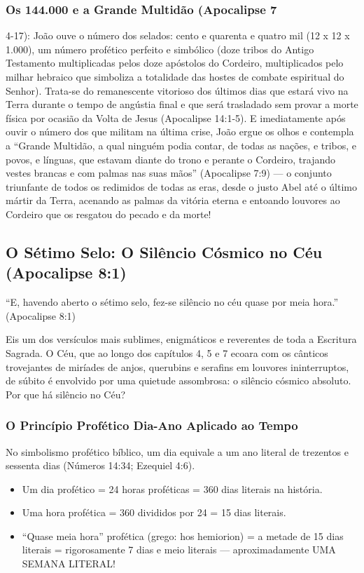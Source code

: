\subsubsection*{Os 144.000 e a Grande Multidão (Apocalipse 7}
4-17):
João ouve o número dos selados: cento e quarenta e quatro mil (12 x 12 x 1.000), um número profético perfeito e simbólico (doze tribos do Antigo Testamento multiplicadas pelos doze apóstolos do Cordeiro, multiplicados pelo milhar hebraico que simboliza a totalidade das hostes de combate espiritual do Senhor). Trata-se do remanescente vitorioso dos últimos dias que estará vivo na Terra durante o tempo de angústia final e que será trasladado sem provar a morte física por ocasião da Volta de Jesus (Apocalipse 14:1-5).
E imediatamente após ouvir o número dos que militam na última crise, João ergue os olhos e contempla a ``Grande Multidão, a qual ninguém podia contar, de todas as nações, e tribos, e povos, e línguas, que estavam diante do trono e perante o Cordeiro, trajando vestes brancas e com palmas nas suas mãos'' (Apocalipse 7:9) — o conjunto triunfante de todos os redimidos de todas as eras, desde o justo Abel até o último mártir da Terra, acenando as palmas da vitória eterna e entoando louvores ao Cordeiro que os resgatou do pecado e da morte!



\subsection{O Sétimo Selo: O Silêncio Cósmico no Céu (Apocalipse 8:1)}


``E, havendo aberto o sétimo selo, fez-se silêncio no céu quase por meia hora.'' (Apocalipse 8:1)

Eis um dos versículos mais sublimes, enigmáticos e reverentes de toda a Escritura Sagrada. O Céu, que ao longo dos capítulos 4, 5 e 7 ecoara com os cânticos trovejantes de miríades de anjos, querubins e serafins em louvores ininterruptos, de súbito é envolvido por uma quietude assombrosa: o silêncio cósmico absoluto.
Por que há silêncio no Céu?


\subsubsection*{O Princípio Profético Dia-Ano Aplicado ao Tempo}
No simbolismo profético bíblico, um dia equivale a um ano literal de trezentos e sessenta dias (Números 14:34; Ezequiel 4:6).
\begin{itemize}
  \item Um dia profético = 24 horas proféticas = 360 dias literais na história.
  \item Uma hora profética = 360 divididos por 24 = 15 dias literais.
  \item ``Quase meia hora'' profética (grego: hos hemiorion) = a metade de 15 dias literais = rigorosamente 7 dias e meio literais — aproximadamente UMA SEMANA LITERAL!
\end{itemize}



